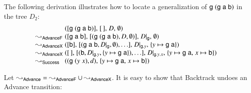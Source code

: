 The following derivation illustrates how to locate a generalization of
$\mathsf{g}\; (\mathsf{g}\;\mathsf{a}\;\mathsf{b})$ in the tree $D_2$:\pagebreak[2]
%
\begin{align*}
 & ([\cst{g} \; (\cst{g} \; \cst{a} \; \cst{b})]{,}\;  [\,]{,}\;  D{,}\;  \emptyset) \\[-1\jot]
 \BDTARROW{\textsf{AdvanceF}}&
 ([\cst{g} \; \cst{a} \; \cst{b}]{,}\;  [(\cst{g} \; (\cst{g} \; \cst{a} \; \cst{b}), D, \emptyset)]{,}\;  D{|}_{\cst{g}}{,}\;  \emptyset)\\[-1\jot]
 \BDTARROW{\textsf{AdvanceX}}&
 ([\cst{b}]{,}\;  [(\cst{g} \; \cst{a} \; \cst{b}, D{|}_{\cst{g}}, \emptyset), \ldots]{,}\;  D{|}_{\cst{g}.y}{,}\;  \{y \mapsto \cst{g} \; \cst{a} \}) \\[-1\jot]
 \BDTARROW{\textsf{AdvanceX}}&
 ([\,]{,}\;  [(\cst{b}, D{|}_{\cst{g}.y}, \{y \mapsto \cst{g} \; \cst{a} \}), \ldots]{,}\; D{|}_{\cst{g}.y.x}{,}\; \{ y \mapsto \cst{g} \; \cst{a}{,}\; x \mapsto \cst{b} \}) \\[-1\jot]
 \BDTARROW{\textsf{Success}}& ((\cst{g} \; (y \; x), d){,}\; \{ y \mapsto \cst{g} \; \cst{a}{,}\; x \mapsto \cst{b} \})
\end{align*}

Let ${\leadsto_{\mathsf{Advance}}} = {\leadsto_{\mathsf{AdvanceF}}} \cup
{\leadsto_{\mathsf{AdvanceX}}}$.
It is easy to show that \textsf{Backtrack} undoes an \textsf{Advance}
transition: %

